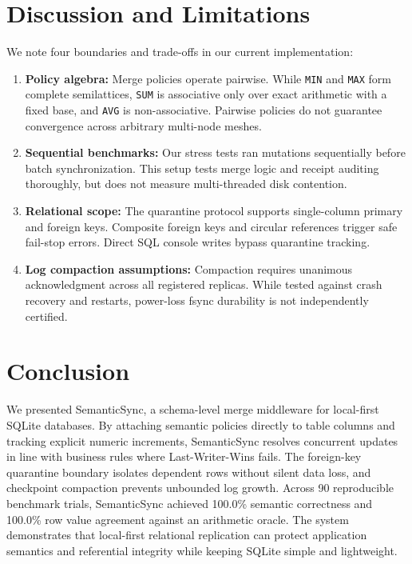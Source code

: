 \documentclass[conference]{IEEEtran}
\begin{document}
\section{Discussion and Limitations}

We note four boundaries and trade-offs in our current implementation:
\begin{enumerate}
    \item \textbf{Policy algebra:} Merge policies operate pairwise. While \texttt{MIN} and \texttt{MAX} form complete semilattices, \texttt{SUM} is associative only over exact arithmetic with a fixed base, and \texttt{AVG} is non-associative. Pairwise policies do not guarantee convergence across arbitrary multi-node meshes.
    \item \textbf{Sequential benchmarks:} Our stress tests ran mutations sequentially before batch synchronization. This setup tests merge logic and receipt auditing thoroughly, but does not measure multi-threaded disk contention.
    \item \textbf{Relational scope:} The quarantine protocol supports single-column primary and foreign keys. Composite foreign keys and circular references trigger safe fail-stop errors. Direct SQL console writes bypass quarantine tracking.
    \item \textbf{Log compaction assumptions:} Compaction requires unanimous acknowledgment across all registered replicas. While tested against crash recovery and restarts, power-loss fsync durability is not independently certified.
\end{enumerate}

\section{Conclusion}

We presented SemanticSync, a schema-level merge middleware for local-first SQLite databases. By attaching semantic policies directly to table columns and tracking explicit numeric increments, SemanticSync resolves concurrent updates in line with business rules where Last-Writer-Wins fails. The foreign-key quarantine boundary isolates dependent rows without silent data loss, and checkpoint compaction prevents unbounded log growth. Across 90 reproducible benchmark trials, SemanticSync achieved 100.0\% semantic correctness and 100.0\% row value agreement against an arithmetic oracle. The system demonstrates that local-first relational replication can protect application semantics and referential integrity while keeping SQLite simple and lightweight.
\end{document}
